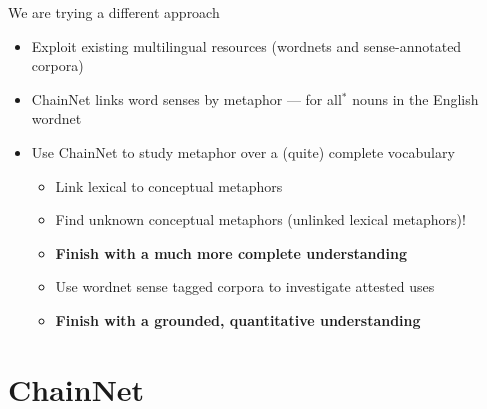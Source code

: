 \documentclass[xetex]{beamer}  %
\begin{document}
\begin{frame}{We are trying a different approach}
  \begin{itemize}
  \item Exploit existing multilingual resources (wordnets and sense-annotated corpora)
  \item ChainNet links word senses by metaphor --- for all$^*$ nouns in the English wordnet
  \item Use ChainNet to study metaphor over a (quite) complete vocabulary
    \begin{itemize}
    \item Link lexical to conceptual metaphors
    \item Find unknown conceptual metaphors (unlinked lexical metaphors)!
    \item \textbf{Finish with a much more complete understanding}
    \item Use wordnet sense tagged corpora to investigate attested uses
    \item \textbf{Finish with a grounded, quantitative understanding}
    \end{itemize}
  \end{itemize}
\end{frame}




\section{ChainNet}
\label{sec:chainnet}
\end{document}
